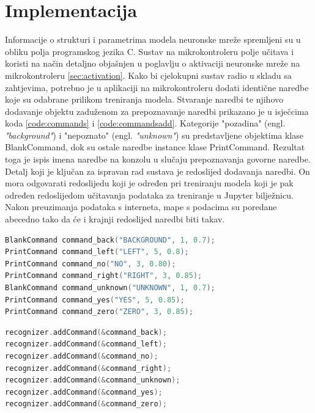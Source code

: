 \chapter{Implementacija}
\label{pog:implement}

Informacije o strukturi i parametrima modela neuronske mreže spremljeni su u obliku polja
programskog jezika C. Sustav na mikrokontroleru polje učitava i koristi na način detaljno 
objašnjen 
u poglavlju o aktivaciji neuronske mreže na mikrokontroleru \ref{sec:activation}.
Kako bi cjelokupni sustav radio u skladu sa zahtjevima, potrebno je u aplikaciji
na mikrokontroleru dodati identične naredbe koje su odabrane prilikom treniranja
modela. Stvaranje naredbi te njihovo dodavanje objektu zaduženom za prepoznavanje
naredbi prikazano je u isječcima koda \ref{code:commands} i \ref{code:commandsadd}.
Kategorije "pozadina" (engl. \textit{"background"}) i
"nepoznato" (engl. \textit{"unknown"}) su predstavljene objektima klase BlankCommand, 
dok su ostale naredbe 
instance klase PrintCommand. Rezultat toga je ispis imena naredbe na konzolu u slučaju
prepoznavanja govorne naredbe. Detalj koji je ključan za ispravan rad sustava je redoslijed
dodavanja naredbi. On mora odgovarati redoslijedu koji je određen pri treniranju modela koji
je pak određen redoslijedom učitavanja podataka za treniranje u Jupyter bilježnicu. Nakon
preuzimanja podataka s interneta, mape s podacima su poredane abecedno tako da 
će i krajnji redoslijed naredbi biti takav.

\begin{lstlisting}[language=C++, caption=Stvaranje naredbi, label=code:commands]
BlankCommand command_back("BACKGROUND", 1, 0.7);
PrintCommand command_left("LEFT", 5, 0.8);
PrintCommand command_no("NO", 3, 0.80);
PrintCommand command_right("RIGHT", 3, 0.85);
BlankCommand command_unknown("UNKNOWN", 1, 0.7);
PrintCommand command_yes("YES", 5, 0.85);
PrintCommand command_zero("ZERO", 3, 0.85);
\end{lstlisting}

\newpage
\begin{lstlisting}[language=C++, caption=Dodavanje naredbi, label=code:commandsadd]
recognizer.addCommand(&command_back);
recognizer.addCommand(&command_left);
recognizer.addCommand(&command_no);
recognizer.addCommand(&command_right);
recognizer.addCommand(&command_unknown);
recognizer.addCommand(&command_yes);
recognizer.addCommand(&command_zero);
\end{lstlisting}

